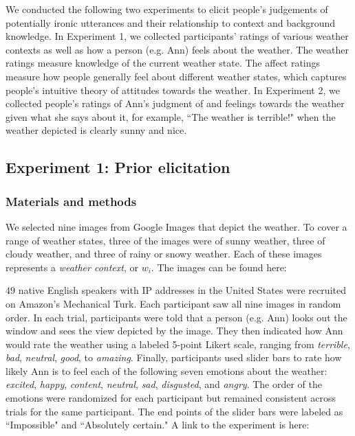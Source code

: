 \documentclass[10pt,letterpaper]{article}
\begin{document}

We conducted the following two experiments to elicit people's judgements of potentially ironic utterances and their relationship to context and background knowledge. In Experiment 1, we collected participants' ratings of various weather contexts as well as how a person (e.g. Ann) feels about the weather. The weather ratings measure knowledge of the current weather state. The affect ratings measure how people generally feel about different weather states, which captures people's intuitive theory of attitudes towards the weather. In Experiment 2, we collected people's ratings of Ann's judgment of and feelings towards the weather given what she says about it, for example, ``The weather is terrible!" when the weather depicted is clearly sunny and nice.

\subsection{Experiment 1: Prior elicitation}
\subsubsection{Materials and methods}
We selected nine images from Google Images that depict the weather. To cover a range of weather states, three of the images were of sunny weather, three of cloudy weather, and three of rainy or snowy weather. Each of these images represents a \emph{weather context}, or $w_i$. The images can be found here:

$49$ native English speakers with IP addresses in the United States were recruited on Amazon's Mechanical Turk. Each participant saw all nine images in random order. In each trial, participants were told that a person (e.g. Ann) looks out the window and sees the view depicted by the image. They then indicated how Ann would rate the weather using a labeled 5-point Likert scale, ranging from \emph{terrible}, \emph{bad}, \emph{neutral}, \emph{good}, to \emph{amazing}. Finally, participants used slider bars to rate how likely Ann is to feel each of the following seven emotions about the weather: \emph{excited}, \emph{happy}, \emph{content}, \emph{neutral}, \emph{sad}, \emph{disgusted}, and \emph{angry}.  The order of the emotions were randomized for each participant but remained consistent across trials for the same participant. The end points of the slider bars were labeled as ``Impossible" and ``Absolutely certain." A link to the experiment is here:
  
\end{document}
